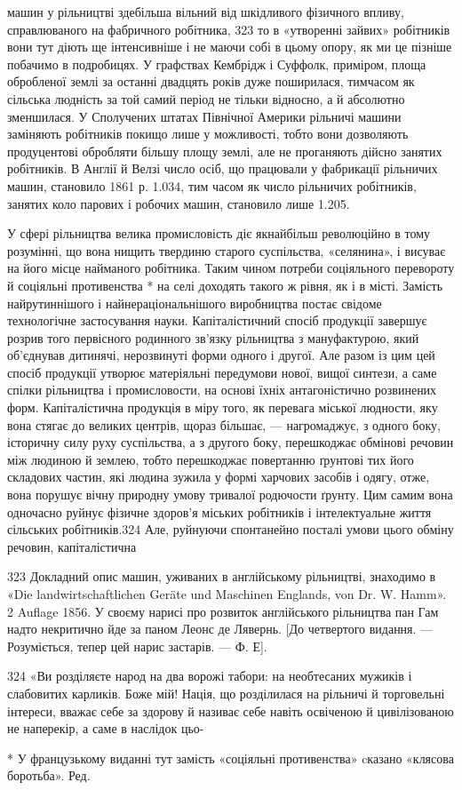 машин у рільництві здебільша вільний від шкідливого фізичного
впливу, справлюваного на фабричного робітника, 323
то в «утворенні зайвих» робітників вони тут діють ще інтенсивніше
і не маючи собі в цьому опору, як ми це пізніше
побачимо в подробицях. У графствах Кембрідж і Суффолк, приміром,
площа обробленої землі за останні двадцять років дуже
поширилася, тимчасом як сільська людність за той самий період
не тільки відносно, а й абсолютно зменшилася. У Сполучених
штатах Північної Америки рільничі машини заміняють робітників
покищо лише у можливості, тобто вони дозволяють продуцентові
обробляти більшу площу землі, але не проганяють дійсно
занятих робітників. В Англії й Велзі число осіб, що працювали
у фабрикації рільничих машин, становило 1861 р. 1.034, тим часом
як число рільничих робітників, занятих коло парових і робочих
машин, становило лише 1.205.

У сфері рільництва велика промисловість діє якнайбільш
революційно в тому розумінні, що вона нищить твердиню старого
суспільства, «селянина», і висуває на його місце найманого робітника.
Таким чином потреби соціяльного перевороту й соціяльні
противенства * на селі доходять такого ж рівня, як і в місті.
Замість найрутиннішого і найнераціональнішого виробництва
постає свідоме технологічне застосування науки. Капіталістичний
спосіб продукції завершує розрив того первісного родинного
зв’язку рільництва з мануфактурою, який об’єднував дитинячі,
нерозвинуті форми одного і другої. Але разом із цим цей спосіб
продукції утворює матеріяльні передумови нової, вищої
синтези, а саме спілки рільництва і промисловости, на основі
їхніх антагоністично розвинених форм. Капіталістична продукція
в міру того, як перевага міської людности, яку вона стягає до
великих центрів, щораз більшає, — нагромаджує, з одного боку,
історичну силу руху суспільства, а з другого боку, перешкоджає
обмінові речовин між людиною й землею, тобто перешкоджає
повертанню ґрунтові тих його складових частин, які людина
зужила у формі харчових засобів і одягу, отже, вона порушує
вічну природну умову тривалої родючости ґрунту. Цим самим
вона одночасно руйнує фізичне здоров’я міських робітників і
інтелектуальне життя сільських робітників.324  Але, руйнуючи
спонтанейно посталі умови цього обміну речовин, капіталістична

323 Докладний опис машин, уживаних в англійському рільництві,
знаходимо в «Die landwirtschaftlichen Geräte und Maschinen Englands,
von Dr. W. Hamm». 2 Auflage 1856. У своєму нарисі про розвиток англійського
рільництва пан Гам надто некритично йде за паном Леонс де
Лявернь. [До четвертого видання. — Розуміється, тепер цей нарис застарів.
— Ф. Е].

324 «Ви розділяєте народ на два ворожі табори: на необтесаних мужиків
і слабовитих карликів. Боже мій! Нація, що розділилася на рільничі
й торговельні інтереси, вважає себе за здорову й називає себе
навіть освіченою й цивілізованою не наперекір, а саме в наслідок цьо-

* У французькому виданні тут замість «соціяльні противенства»
cказано «клясова боротьба». Ред.
